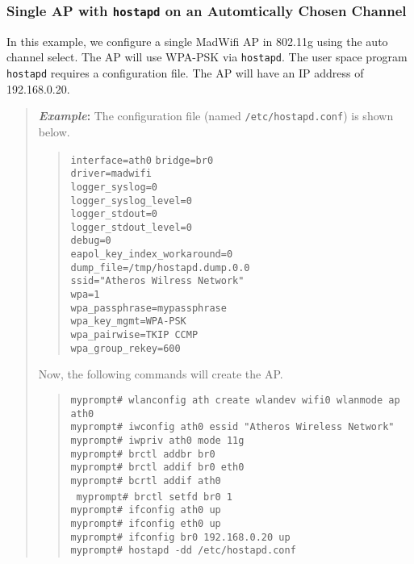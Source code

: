 \documentclass[10pt,fullpage]{article}
\newcommand{\mytt}[1]{{\texttt{#1}}}
\newcommand{\bv}{\begin{verse}}
\newcommand{\ev}{\end{verse}}
\newcommand{\cmd}[1]{{\texttt{myprompt\# #1}}}
\newenvironment{example}{\begin{quote}\textbf{\textit{Example}:}}{\end{quote}}
\begin{document}
\subsubsection{Single AP with \mytt{hostapd} on an Automtically Chosen
  Channel}
In this example, we configure a single MadWifi AP in 802.11g using the
auto channel select.  The AP will use WPA-PSK via \mytt{hostapd}.
The user space program \mytt{hostapd} requires a configuration
file.  The AP will have an IP address of 192.168.0.20.

\begin{example}
  The configuration file (named \mytt{/etc/hostapd.conf}) is shown
  below.
  \bv
  \mytt{interface=ath0}
  \mytt{bridge=br0}\\
  \mytt{driver=madwifi}\\
  \mytt{logger\_syslog=0}\\
  \mytt{logger\_syslog\_level=0}\\
  \mytt{logger\_stdout=0}\\
  \mytt{logger\_stdout\_level=0}\\
  \mytt{debug=0}\\
  \mytt{eapol\_key\_index\_workaround=0}\\
  \mytt{dump\_file=/tmp/hostapd.dump.0.0}\\
  \mytt{ssid="Atheros Wilress Network"}\\
  \mytt{wpa=1}\\
  \mytt{wpa\_passphrase=mypassphrase}\\
  \mytt{wpa\_key\_mgmt=WPA-PSK}\\
  \mytt{wpa\_pairwise=TKIP CCMP}\\
  \mytt{wpa\_group\_rekey=600}
  \ev
  Now, the following commands will create the AP.
  \bv
  \cmd{wlanconfig ath create wlandev wifi0 wlanmode ap}\\
  \mytt{ath0}\\
  \cmd{iwconfig ath0 essid "Atheros Wireless Network"}\\
  \cmd{iwpriv ath0 mode 11g}\\
  \cmd{brctl addbr br0}\\
  \cmd{brctl addif br0 eth0}\\
  \cmd{bcrtl addif ath0}\\\
  \cmd{brctl setfd br0 1}\\
  \cmd{ifconfig ath0 up}\\
  \cmd{ifconfig eth0 up}\\
  \cmd{ifconfig br0 192.168.0.20 up}\\
  \cmd{hostapd -dd /etc/hostapd.conf}
  \ev
\end{example}
\end{document}
